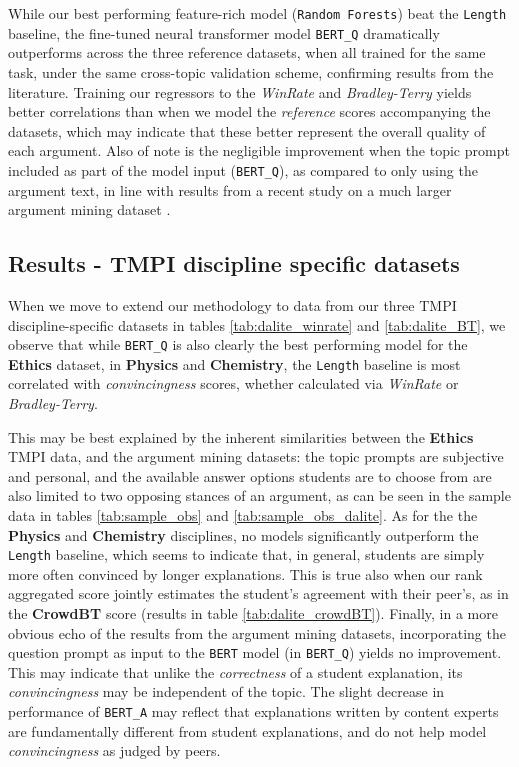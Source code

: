 \documentclass[notitlepage,12pt]{jedm}
\begin{document}
While our best performing feature-rich model (\verb|Random Forests|) beat the 
\verb|Length| baseline, the fine-tuned neural transformer model \verb|BERT_Q| 
dramatically outperforms across the three reference datasets, when all trained 
for the same task, under the same cross-topic validation scheme, confirming 
results from the literature.
Training our regressors to the \textit{WinRate}  and \textit{Bradley-Terry} 
yields better correlations than when we model the \textit{reference} scores 
accompanying the datasets, which may indicate that these better represent the 
overall quality of each argument.
Also of note is the negligible improvement when the topic prompt included as 
part of the model input (\verb|BERT_Q|), as compared to only using the argument 
text, in line with results from a recent study on a much larger argument mining 
dataset \cite{gretz_large-scale_2019}.


\subsection{Results - TMPI discipline specific datasets}
When we move to extend our methodology to data from our three TMPI 
discipline-specific datasets in tables \ref{tab:dalite_winrate} and 
\ref{tab:dalite_BT}, we observe that while \verb|BERT_Q| is also clearly the 
best performing model for the \textbf{Ethics} dataset, in \textbf{Physics} and 
\textbf{Chemistry}, the \verb|Length| baseline is most correlated with 
\textit{convincingness} scores, whether calculated via \textit{WinRate} or 
\textit{Bradley-Terry}.

This may be best explained by the inherent similarities between the 
\textbf{Ethics} TMPI data, and the argument mining datasets: the topic prompts 
are subjective and personal, and the available answer options students are to 
choose from are also limited to two opposing stances of an argument, as can be 
seen in the sample data in tables \ref{tab:sample_obs} and 
\ref{tab:sample_obs_dalite}. 
As for the the \textbf{Physics} and \textbf{Chemistry} disciplines, no models 
significantly outperform the \verb|Length| baseline, which seems to indicate 
that, in general, students are simply more often convinced by longer 
explanations.
This is true also when our rank aggregated score jointly estimates the 
student's agreement with their peer's, as in the \textbf{CrowdBT} score 
(results in table \ref{tab:dalite_crowdBT}).
Finally, in a more obvious echo of the results from the argument mining 
datasets, incorporating the question prompt as input to the \verb|BERT| model 
(in \verb|BERT_Q|) yields no improvement.
This may indicate that unlike the \textit{correctness} of a student 
explanation, its \textit{convincingness} may be independent of the topic.
The slight decrease in performance of \verb|BERT_A| may reflect that 
explanations written by content experts are fundamentally different from 
student explanations, and do not help model \textit{convincingness} as judged 
by peers.
\end{document}
